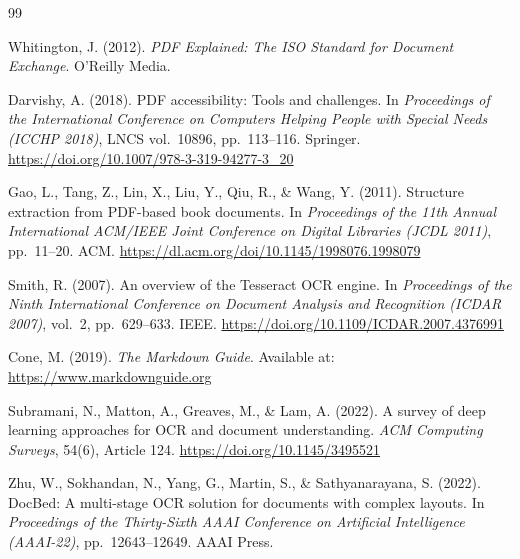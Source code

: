 \documentclass[12pt]{article}
\begin{document}
\newpage
\begin{thebibliography}{99}


Whitington, J. (2012).
\textit{PDF Explained: The ISO Standard for Document Exchange}.
O'Reilly Media.

Darvishy, A. (2018).
PDF accessibility: Tools and challenges.
In \textit{Proceedings of the International Conference on Computers Helping
People with Special Needs (ICCHP 2018)}, LNCS vol.\ 10896, pp.\ 113--116.
Springer.
\url{https://doi.org/10.1007/978-3-319-94277-3_20}

Gao, L., Tang, Z., Lin, X., Liu, Y., Qiu, R., \& Wang, Y. (2011).
Structure extraction from PDF-based book documents.
In \textit{Proceedings of the 11th Annual International ACM/IEEE Joint
Conference on Digital Libraries (JCDL 2011)}, pp.\ 11--20. ACM.
\url{https://dl.acm.org/doi/10.1145/1998076.1998079}

Smith, R. (2007).
An overview of the Tesseract OCR engine.
In \textit{Proceedings of the Ninth International Conference on Document
Analysis and Recognition (ICDAR 2007)}, vol.\ 2, pp.\ 629--633. IEEE.
\url{https://doi.org/10.1109/ICDAR.2007.4376991}

Cone, M. (2019).
\textit{The Markdown Guide}.
Available at: \url{https://www.markdownguide.org}


Subramani, N., Matton, A., Greaves, M., \& Lam, A. (2022).
A survey of deep learning approaches for OCR and document understanding.
\textit{ACM Computing Surveys}, 54(6), Article 124.
\url{https://doi.org/10.1145/3495521}

Zhu, W., Sokhandan, N., Yang, G., Martin, S., \& Sathyanarayana, S. (2022).
DocBed: A multi-stage OCR solution for documents with complex layouts.
In \textit{Proceedings of the Thirty-Sixth AAAI Conference on Artificial
Intelligence (AAAI-22)}, pp.\ 12643--12649. AAAI Press.


\end{thebibliography}
\end{document}
